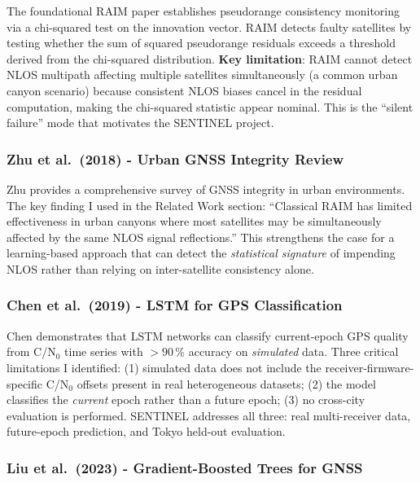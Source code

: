 \documentclass[12pt,a4paper]{article}
\begin{document}
The foundational RAIM paper establishes pseudorange consistency monitoring via a
chi-squared test on the innovation vector.
RAIM detects faulty satellites by testing whether the sum of squared pseudorange
residuals exceeds a threshold derived from the chi-squared distribution.
\textbf{Key limitation}: RAIM cannot detect NLOS multipath affecting multiple satellites
simultaneously (a common urban canyon scenario) because consistent NLOS biases cancel
in the residual computation, making the chi-squared statistic appear nominal.
This is the ``silent failure'' mode that motivates the SENTINEL project.

\subsubsection{Zhu et al.\ (2018) - Urban GNSS Integrity Review \cite{zhu2018gnss}}

Zhu provides a comprehensive survey of GNSS integrity in urban environments.
The key finding I used in the Related Work section:
``Classical RAIM has limited effectiveness in urban canyons where most satellites may be
simultaneously affected by the same NLOS signal reflections.''
This strengthens the case for a learning-based approach that can detect the
\emph{statistical signature} of impending NLOS rather than relying on inter-satellite
consistency alone.

\subsubsection{Chen et al.\ (2019) - LSTM for GPS Classification \cite{chen2019gps}}

Chen demonstrates that LSTM networks can classify current-epoch GPS quality from C/N$_0$
time series with $> 90$\,\% accuracy on \emph{simulated} data.
Three critical limitations I identified:
(1) simulated data does not include the receiver-firmware-specific C/N$_0$ offsets
  present in real heterogeneous datasets;
(2) the model classifies the \emph{current} epoch rather than a future epoch;
(3) no cross-city evaluation is performed.
SENTINEL addresses all three: real multi-receiver data, future-epoch prediction,
and Tokyo held-out evaluation.

\subsubsection{Liu et al.\ (2023) - Gradient-Boosted Trees for GNSS \cite{liu2023gnss}}
\end{document}
